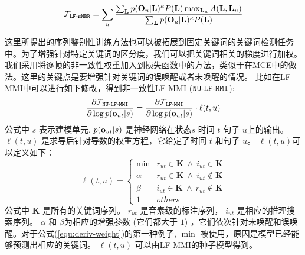 \begin{equation}
\label{equ:kws-smbr}
\begin{split}
\mathcal{F}_{\tt{LF\text{-}sMBR}}
=\sum_{u}  \frac {\sum_{\mathbf{L}} p(\mathbf{O}_u|\mathbf{L})^{\kappa}P(\mathbf{L})\mathop{\max}_{\mathbf{L}_u} A(\mathbf{L},\mathbf{L}_u)}{\sum_{\mathbf{L}} p(\mathbf{O}_u|\mathbf{L})^{\kappa}P(\mathbf{L})}  
\end{split}
\end{equation}


这里所提出的序列鉴别性训练方法也可以被拓展到固定关键词的关键词检测任务中。为了增强针对特定关键词的区分度，我们可以把关键词相关的梯度进行加权。我们采用将逐帧的非一致性权重加入到损失函数中的方法，类似于\cite{meng2016non}在MCE中的做法。这里的关键点是要增强针对关键词的误唤醒或者未唤醒的情况。
比如在LF-MMI中可以进行如下修改，得到非一致性LF-MMI ($\tt{NU\text{-}LF\text{-}MMI}$):
\begin{equation}
\label{equ:kws-nummi}
\begin{split}
\frac{\partial \mathcal{F}_{\tt{NU\text{-}LF\text{-}MMI}}}{\partial\log p({\bf o}_{ut}|s)}
=\frac{\partial \mathcal{F}_{\tt{LF\text{-}MMI}}}{\partial\log p({\bf o}_{ut}|s)}\cdot  \ell(t,u)
\end{split}
\end{equation}
公式中 $s$ 表示建模单元, $p({\bf o}_{ut}|s)$ 是神经网络在状态$s$ 时间 $t$ 句子 $u$上的输出。
$\ell(t,u)$ 是求导后针对导数的权重方程，它给定了时间 $t$ 和句子 $u$。 $\ell(t,u)$可以定义如下：
\begin{equation}
\label{equ:deriv-weight}
\ell(t,u)=
\begin{cases}
\mathop{\min(\alpha,\beta)}& r_{ut}\in \mathbf{K}\ \land\ i_{ut}\in \mathbf{K}\\
\alpha& r_{ut}\in \mathbf{K}\ \land\ i_{ut}\notin \mathbf{K}\\
\beta& i_{ut}\in \mathbf{K}\ \land\ r_{ut}\notin \mathbf{K}\\
1& others
\end{cases}
\end{equation}
公式中 $\mathbf{K}$ 是所有的关键词序列。 $r_{ut}$   是音素级的标注序列， $i_{ut}$ 是相应的推理搜索序列。 $\alpha$ 和 $\beta$为相应的增强参数 (它们都大于 $1$) ，它们依次针对未唤醒和误唤醒。对于公式(\ref{equ:deriv-weight})的第一种例子, $\mathop{\min(\alpha,\beta)}$ 被使用，原因是模型已经能够预测出相应的关键词。 $\ell(t,u)$ 可以由LF-MMI的种子模型得到。

